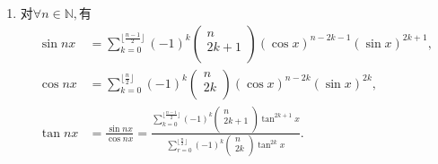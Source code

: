 \documentclass[../../main.tex]{subfiles}%
\begin{document}
\begin{theorem}\label{theorem:sinnx和cosnx以及sin^nx和cos^nx的展开式}
\begin{enumerate}
\item 对$\forall n\in \mathbb{N},$有
\begin{align*}
\sin nx&=\sum_{k=0}^{\lfloor \frac{n-1}{2} \rfloor}{\left( -1 \right) ^k\left( \begin{array}{c}
n\\
2k+1\\
\end{array} \right) (\cos x)^{n-2k-1}(\sin x)^{2k+1}},
\\
\cos nx&=\sum_{k=0}^{\lfloor \frac{n}{2} \rfloor}{\left( -1 \right) ^k\left( \begin{array}{c}
n\\
2k\\
\end{array} \right) (\cos x)^{n-2k}(\sin x)^{2k}},
\\
\tan nx&=\frac{\sin nx}{\cos nx}=\frac{\sum\limits_{k=0}^{\lfloor \frac{n-1}{2} \rfloor}{\left( -1 \right) ^k\left( \begin{array}{c}
n\\
2k+1\\
\end{array} \right) \tan ^{2k+1}x}}{\sum\limits_{r=0}^{\lfloor \frac{n}{2} \rfloor}{\left( -1 \right) ^k\left( \begin{array}{c}
n\\
2k\\
\end{array} \right) \tan ^{2k}x}}.
\end{align*}


\end{enumerate}
\end{theorem}
\end{document}
